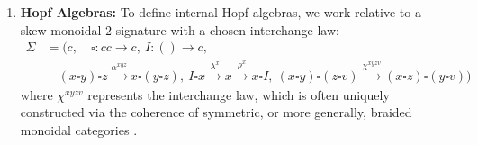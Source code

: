 \begin{examples}
\begin{enumerate}
   By definition, the category $M^T$ is the equifier of the parallel pair of natural transformations:
   \begin{align*}
   &\left(\overline{\mu \circ (\mu \square s)}_M, \,\, \overline{\rho_s}_M, \,\, \overline{\lambda_s}_M\right), \,\, \left(\overline{\mu \circ (s \square \mu) \circ \alpha_{s,s,s}}_M, \,\, \overline{\mu \circ (s \square u)}_M, \,\, \overline{\mu \circ (u \square s)}_M\right)\colon \\
   &\left(M((s \square s)\square s)U_M, \,\, M(s \square I)U_M, \,\, M(I \square s)U_M\right) \Rightarrow (U_M, \,\, U_M, \,\, U_M)\colon M^\sigma\to M_c^3
   \end{align*}
   This means an object $(x, m, e)$ of $M^\sigma$ is in $M^T$ if and only if
   {\small
   \[
   \left(\overline{\mu \circ (\mu \square s)}_M, \,\, \overline{\rho_s}_M, \,\, \overline{\lambda_s}_M\right)_{(x,m,e)} = \left(\overline{\mu \circ (s \square \mu) \circ \alpha_{s,s,s}}_M, \,\, \overline{\mu \circ (s \square u)}_M, \,\, \overline{\mu \circ (u \square s)}_M\right)_{(x,m,e)},
   \]
   that is, if and only if the following three equations hold in $M_c$:
   \begin{align*}
       m \circ (m \otimes x) &= m \circ (x \otimes m) \circ M(\alpha)_{x,x,x} \\
       m \circ (x \otimes e) &= M(\rho)_x \\
       m \circ (e \otimes x) &= M(\lambda)_x
   \end{align*}
   }
   These are precisely the classical associativity and unit laws for a monoid in $M$.

\item \textbf{Hopf Algebras:}
    To define internal Hopf algebras, we work relative to a skew-monoidal $2$-signature with a chosen interchange law:
    {\small
    \begin{align*}
        \Sigma&=(c, \quad \square \colon cc \to c,\ I \colon () \to c, \\
        &\quad (x \square y) \square z\xrightarrow{\alpha^{xyz}}  x \square (y \square z),\ I \square x \xrightarrow{\lambda^x} x \xrightarrow{\rho^x} x \square I,\ (x \square y) \square (z \square v) \xrightarrow{\chi^{xyzv}} (x \square z) \square (y \square v))
    \end{align*}
    }
    where $\chi^{xyzv}$ represents the interchange law, which is often uniquely constructed via the coherence of symmetric, or more generally, braided monoidal categories \cite{MacLane1998, joyalBraidedTensorCategories1993, streetQuantumGroupsPath2007}.


\end{enumerate}
\end{examples}
